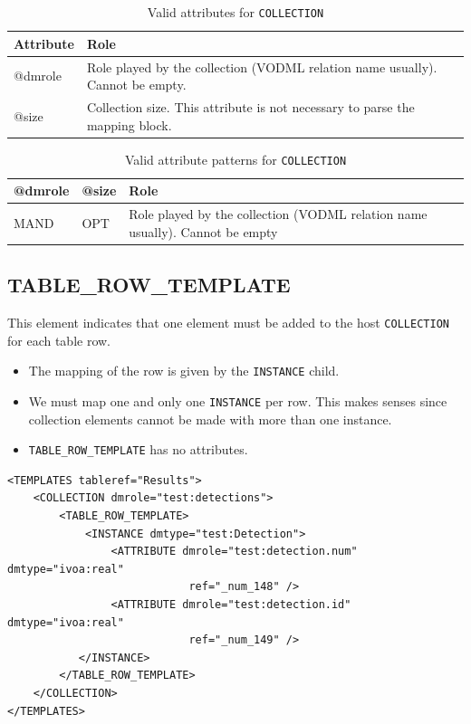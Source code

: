 \documentclass[11pt,a4paper]{ivoa}
\begin{document}
\begin{table}[!hbtp]
\small
\centering
\begin{tabulary}{\linewidth}{|L|J|}
       \hline 
           \textbf{Attribute} & 
           \textbf{Role}\\
       \hline  \hline
          @dmrole    & 
           Role played by the collection (VODML relation name usually). Cannot be empty.\\       
       \hline  
          @size    & 
          Collection size. This attribute is not necessary to parse the mapping block.\\       
       \hline 
 \end{tabulary}
 \caption{Valid attributes for  \texttt{COLLECTION}} 
 \label{tbl:att-att}
 \end{table}


\begin{table}[!t]
\small
\centering
\begin{tabulary}{\linewidth}{|L|L|J|}
    \hline 
        @dmrole   & 
        @size   &  
        Role\\
    \hline  \hline
       MAND & 
       OPT & 
       Role played by the collection (VODML relation name usually). Cannot be empty \\    
    \hline 
  \end{tabulary}
  \caption{Valid attribute patterns for  \texttt{COLLECTION}} 
  \label{tbl:coll-pattern}
 \end{table}

%
%
\clearpage
\subsection{TABLE\_ROW\_TEMPLATE}
This element indicates that one element must be added to the host \texttt{COLLECTION} for each table row.

\begin{itemize}
    \item The mapping of the row is given by the \texttt{INSTANCE} child.
    \item We must map one and only one \texttt{INSTANCE} per row. 
             This makes senses since collection elements cannot be made with more than one instance.
   \item \texttt{TABLE\_ROW\_TEMPLATE}  has no attributes.
\end{itemize}

\begin{lstlisting}[caption={TABLE\_ROW\_TEMPLATE examples},style=XML]
<TEMPLATES tableref="Results">
    <COLLECTION dmrole="test:detections">
        <TABLE_ROW_TEMPLATE>
            <INSTANCE dmtype="test:Detection">
                <ATTRIBUTE dmrole="test:detection.num" dmtype="ivoa:real"
                            ref="_num_148" />
                <ATTRIBUTE dmrole="test:detection.id" dmtype="ivoa:real"
                            ref="_num_149" />
           </INSTANCE>
        </TABLE_ROW_TEMPLATE>
    </COLLECTION>
</TEMPLATES>
\end{lstlisting}
\end{document}
